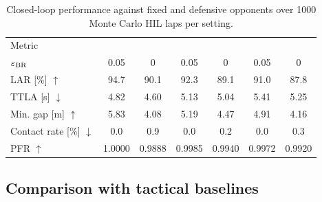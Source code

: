 \documentclass[sensors,article,submit,moreauthors]{Definitions/mdpi}
\begin{document}
\begin{table}[!htbp]
\centering
\scriptsize
\setlength{\tabcolsep}{1.0pt}
\renewcommand{\arraystretch}{1.05}
\caption{Closed-loop performance against fixed and defensive opponents over
1000 Monte Carlo HIL laps per setting.}
\label{tab:reactive_opponents}
\begin{tabular}{@{}lcccccc@{}}
\toprule
Metric &  &
 &
 \\
\cmidrule(lr){2-3}\cmidrule(lr){4-5}\cmidrule(l){6-7}
$\varepsilon_{\rm BR}$ & 0.05 & 0 & 0.05 & 0 & 0.05 & 0 \\
\midrule
LAR [\%] $\uparrow$ & 94.7 & 90.1 & 92.3 & 89.1 & 91.0 & 87.8 \\
TTLA [s] $\downarrow$ & 4.82 & 4.60 & 5.13 & 5.04 & 5.41 & 5.25 \\
Min. gap [m] $\uparrow$ & 5.83 & 4.08 & 5.19 & 4.47 & 4.91 & 4.16 \\
Contact rate [\%] $\downarrow$ & 0.0 & 0.9 & 0.0 & 0.2 & 0.0 & 0.3 \\
PFR $\uparrow$ & 1.0000 & 0.9888 & 0.9985 & 0.9940 & 0.9972 & 0.9920 \\
\bottomrule
\end{tabular}
\end{table}





\subsection{Comparison with tactical baselines}
\label{subsec:comparison}
\end{document}
